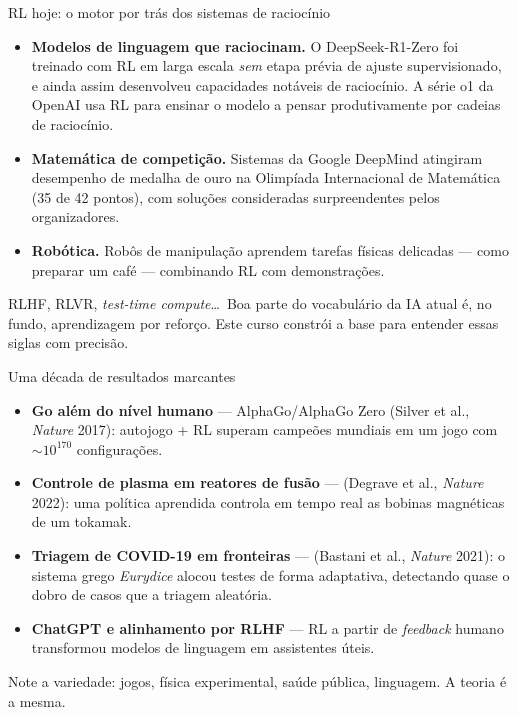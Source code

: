 \documentclass[aspectratio=169, 11pt]{beamer}
\begin{document}
\begin{frame}{RL hoje: o motor por trás dos sistemas de raciocínio}
  \begin{itemize}
    \item \textbf{Modelos de linguagem que raciocinam.} O DeepSeek-R1-Zero
          foi treinado com RL em larga escala \emph{sem} etapa prévia de
          ajuste supervisionado, e ainda assim desenvolveu capacidades
          notáveis de raciocínio. A série o1 da OpenAI usa RL para ensinar
          o modelo a pensar produtivamente por cadeias de raciocínio.
    \item \textbf{Matemática de competição.} Sistemas da Google DeepMind
          atingiram desempenho de medalha de ouro na Olimpíada
          Internacional de Matemática (35 de 42 pontos), com soluções
          consideradas surpreendentes pelos organizadores.
    \item \textbf{Robótica.} Robôs de manipulação aprendem tarefas físicas
          delicadas — como preparar um café — combinando RL com
          demonstrações.
  \end{itemize}

  \begin{ideiabox}
    RLHF, RLVR, \emph{test-time compute}\ldots\ Boa parte do vocabulário da
    IA atual é, no fundo, aprendizagem por reforço. Este curso constrói a
    base para entender essas siglas com precisão.
  \end{ideiabox}
\end{frame}

\begin{frame}{Uma década de resultados marcantes}
  \begin{itemize}
    \item \textbf{Go além do nível humano} — AlphaGo/AlphaGo Zero
          (Silver et al., \emph{Nature} 2017): autojogo + RL superam
          campeões mundiais em um jogo com $\sim 10^{170}$ configurações.
    \item \textbf{Controle de plasma em reatores de fusão} —
          (Degrave et al., \emph{Nature} 2022): uma política aprendida
          controla em tempo real as bobinas magnéticas de um tokamak.
    \item \textbf{Triagem de COVID-19 em fronteiras} —
          (Bastani et al., \emph{Nature} 2021): o sistema grego
          \emph{Eurydice} alocou testes de forma adaptativa, detectando
          quase o dobro de casos que a triagem aleatória.
    \item \textbf{ChatGPT e alinhamento por RLHF} — RL a partir de
          \emph{feedback} humano transformou modelos de linguagem em
          assistentes úteis.
  \end{itemize}

  \medskip
  {\small\color{rlCinza} Note a variedade: jogos, física experimental,
  saúde pública, linguagem. A teoria é a mesma.}
\end{frame}
\end{document}
